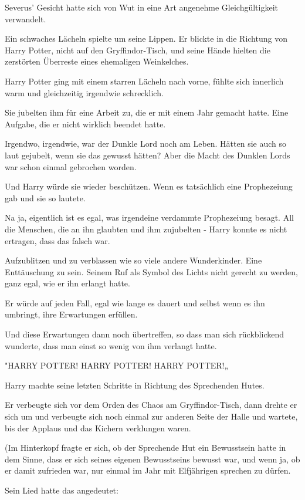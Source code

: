 {Severus' Gesicht hatte sich von Wut in eine Art angenehme Gleichgültigkeit verwandelt.

Ein schwaches Lächeln spielte um seine Lippen. Er blickte in die Richtung von Harry Potter, nicht auf den Gryffindor-Tisch, und seine Hände hielten die zerstörten Überreste eines ehemaligen Weinkelches.

Harry Potter ging mit einem starren Lächeln nach vorne, fühlte sich innerlich warm und gleichzeitig irgendwie schrecklich.

Sie jubelten ihm für eine Arbeit zu, die er mit einem Jahr gemacht hatte. Eine Aufgabe, die er nicht wirklich beendet hatte.

Irgendwo, irgendwie, war der Dunkle Lord noch am Leben. Hätten sie auch so laut gejubelt, wenn sie das gewusst hätten? Aber die Macht des Dunklen Lords war schon einmal gebrochen worden.

Und Harry würde sie wieder beschützen. Wenn es tatsächlich eine Prophezeiung gab und sie so lautete.

Na ja, eigentlich ist es egal, was irgendeine verdammte Prophezeiung besagt. All die Menschen, die an ihn glaubten und ihm zujubelten - Harry konnte es nicht ertragen, dass das falsch war.

Aufzublitzen und zu verblassen wie so viele andere Wunderkinder. Eine Enttäuschung zu sein. Seinem Ruf als Symbol des Lichts nicht gerecht zu werden, ganz egal, wie er ihn erlangt hatte.

Er würde auf jeden Fall, egal wie lange es dauert und selbst wenn es ihn umbringt, ihre Erwartungen erfüllen.

Und diese Erwartungen dann noch übertreffen, so dass man sich rückblickend wunderte, dass man einst so wenig von ihm verlangt hatte.

"HARRY POTTER! HARRY POTTER! HARRY POTTER!„

Harry machte seine letzten Schritte in Richtung des Sprechenden Hutes.

Er verbeugte sich vor dem Orden des Chaos am Gryffindor-Tisch, dann drehte er sich um und verbeugte sich noch einmal zur anderen Seite der Halle und wartete, bis der Applaus und das Kichern verklungen waren.

(Im Hinterkopf fragte er sich, ob der Sprechende Hut ein Bewusstsein hatte in dem Sinne, dass er sich seines eigenen Bewusstseins bewusst war, und wenn ja, ob er damit zufrieden war, nur einmal im Jahr mit Elfjährigen sprechen zu dürfen.

Sein Lied hatte das angedeutet:

}
